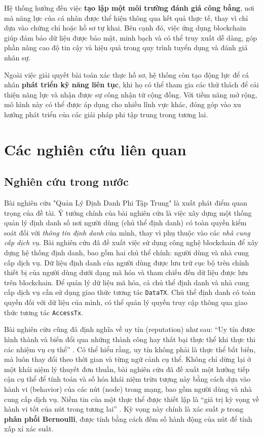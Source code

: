 Hệ thống hướng đến việc \textbf{tạo lập một môi trường đánh giá công bằng}, nơi mà năng lực của cá nhân được thể hiện thông qua kết quả thực tế, thay vì chỉ dựa vào chứng chỉ hoặc hồ sơ tự khai. 
Bên cạnh đó, việc ứng dụng blockchain giúp đảm bảo dữ liệu được bảo mật, minh bạch và có thể truy xuất dễ dàng, góp phần nâng cao độ tin cậy và hiệu quả trong quy trình tuyển dụng và đánh giá nhân sự.

Ngoài việc giải quyết bài toán xác thực hồ sơ, hệ thống còn tạo động lực để cá nhân \textbf{phát triển kỹ năng liên tục}, khi họ có thể tham gia các thử thách để cải thiện năng lực và nhận được sự công nhận từ cộng đồng. 
Với tiềm năng mở rộng, mô hình này có thể được áp dụng cho nhiều lĩnh vực khác, đóng góp vào xu hướng phát triển của các giải pháp phi tập trung trong tương lai.

\section{Các nghiên cứu liên quan}

\subsection{Nghiên cứu trong nước}

Bài nghiên cứu "Quản Lý Định Danh Phi Tập Trung" \cite{quan-ly-dinh-danh-phi-tap-trung} là xuất phát điểm quan trọng của đề tài.
Ý tưởng chính của bài nghiên cứu là việc xây dựng một thống quản lý định danh số nơi người dùng (chủ thể định danh) có toàn quyền kiểm soát đối với \textit{thông tin định danh} của mình, thay vì phụ thuộc vào các \textit{nhà cung cấp dịch vụ}.
Bài nghiên cứu đã đề xuất việc sử dụng công nghệ blockchain để xây dựng hệ thống định danh, bao gồm hai chủ thể chính: người dùng và nhà cung cấp dịch vụ. 
Dữ liệu định danh của người dùng được lưu trữ cục bộ trên chính thiết bị của người dùng dưới dạng mã hóa và tham chiếu đến dữ liệu được lưu trên blockchain.
Để quản lý dữ liệu mã hóa, cả chủ thể định danh và nhà cung cấp dịch vụ cần sử dụng giao thức tương tác \texttt{DataTX}. 
Chủ thể định danh có toàn quyền đối với dữ liệu của mình, có thể quản lý quyền truy cập thông qua giao thức tương tác \texttt{AccessTx}.

Bài nghiên cứu cũng đã định nghĩa về uy tín (reputation) như sau: ``Uy tín được hình thành và biến đổi qua những thành công hay thất bại thực thể khi thực thi các nhiệm vụ cụ thể'' \cite{quan-ly-dinh-danh-phi-tap-trung,a-survey-of-trust-in-internet-applications}.
Có thể hiểu rằng, uy tín không phải là thực thể bất biến, mà luôn thay đổi theo thời gian và từng ngữ cảnh cụ thể. 
Không chỉ dừng lại ở một khái niệm lý thuyết đơn thuần, bài nghiên cứu đã đề xuất một hướng tiếp cận cụ thể để tính toán và số hóa khái niệm trừu tượng này bằng cách dựa vào hành vi (behavior) của các nút (node) trong mạng, bao gồm người dùng và nhà cung cấp dịch vụ. 
Niềm tin của một thực thể được thiết lập là ``giá trị kỳ vọng về hành vi tốt của nút trong tương lai'' \cite{quan-ly-dinh-danh-phi-tap-trung}.
Kỳ vọng này chính là xác suất \(p\) trong \textbf{phân phối Bernoulli}, được tính bằng cách đếm số hành động của nút để tính xấp xỉ xác suất. \cite{thong-ke-may-tinh,quan-ly-dinh-danh-phi-tap-trung}

